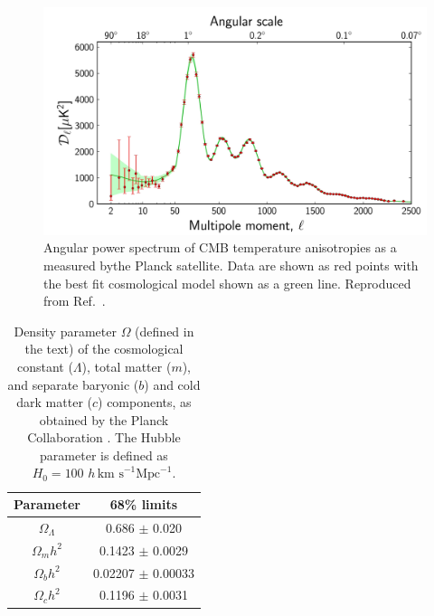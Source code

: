 
\begin{figure}[th]

  \includegraphics[width=\textwidth]{CMBanisotropies.jpg}
  \caption[CMB anisotropies measured by the Planck experiment]{Angular power spectrum of CMB temperature anisotropies as a measured bythe Planck satellite. Data are shown as red points with the best fit \LCDM cosmological model shown as a green line. Reproduced from Ref.~\cite{PlanckI:2013}.}
  \label{fig:intro:CMB}
\end{figure}


\begin{table}[t]
  \begin{center}
	\begin{tabular}{cc}
        \hline\hline
        Parameter & 68\% limits \\
        \hline
        $\Omega_\Lambda$ & 0.686 $\pm$ 0.020 \\
        $\Omega_m h^2$ & 0.1423 $\pm$ 0.0029 \\
        $\Omega_b h^2$ & 0.02207 $\pm$ 0.00033 \\
        $\Omega_c h^2$ & 0.1196 $\pm$ 0.0031 \\
        \hline\hline
	\end{tabular}
  \end{center}
  \caption[Cosmological parameters obtained by the Planck Collaboration]{Density parameter $\Omega$ (defined in the text) of the cosmological constant ($\Lambda$), total matter ($m$), and separate baryonic ($b$) and cold dark matter ($c$) components, as obtained by the Planck Collaboration \cite{PlanckXVI:2013}. The Hubble parameter is defined as $H_0 = 100 \,\,h \, \textrm{km s}^{-1} \textrm{Mpc}^{-1}$.}
  \label{tab:intro:Planck}
\end{table}

